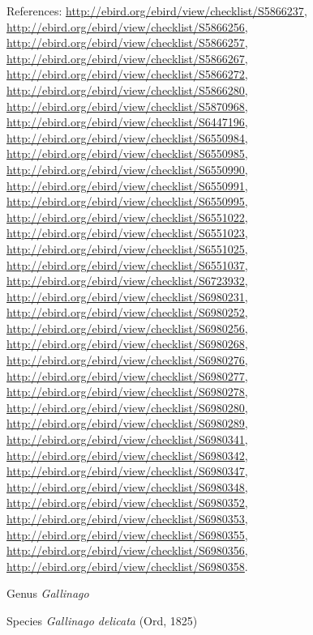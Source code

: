 \documentclass[9pt, article]{memoir}
\begin{document}
\begin{multicols}{2}
\vspace{6pt}References: 
\url{http://ebird.org/ebird/view/checklist/S5866237}, 
\url{http://ebird.org/ebird/view/checklist/S5866256}, 
\url{http://ebird.org/ebird/view/checklist/S5866257}, 
\url{http://ebird.org/ebird/view/checklist/S5866267}, 
\url{http://ebird.org/ebird/view/checklist/S5866272}, 
\url{http://ebird.org/ebird/view/checklist/S5866280}, 
\url{http://ebird.org/ebird/view/checklist/S5870968}, 
\url{http://ebird.org/ebird/view/checklist/S6447196}, 
\url{http://ebird.org/ebird/view/checklist/S6550984}, 
\url{http://ebird.org/ebird/view/checklist/S6550985}, 
\url{http://ebird.org/ebird/view/checklist/S6550990}, 
\url{http://ebird.org/ebird/view/checklist/S6550991}, 
\url{http://ebird.org/ebird/view/checklist/S6550995}, 
\url{http://ebird.org/ebird/view/checklist/S6551022}, 
\url{http://ebird.org/ebird/view/checklist/S6551023}, 
\url{http://ebird.org/ebird/view/checklist/S6551025}, 
\url{http://ebird.org/ebird/view/checklist/S6551037}, 
\url{http://ebird.org/ebird/view/checklist/S6723932}, 
\url{http://ebird.org/ebird/view/checklist/S6980231}, 
\url{http://ebird.org/ebird/view/checklist/S6980252}, 
\url{http://ebird.org/ebird/view/checklist/S6980256}, 
\url{http://ebird.org/ebird/view/checklist/S6980268}, 
\url{http://ebird.org/ebird/view/checklist/S6980276}, 
\url{http://ebird.org/ebird/view/checklist/S6980277}, 
\url{http://ebird.org/ebird/view/checklist/S6980278}, 
\url{http://ebird.org/ebird/view/checklist/S6980280}, 
\url{http://ebird.org/ebird/view/checklist/S6980289}, 
\url{http://ebird.org/ebird/view/checklist/S6980341}, 
\url{http://ebird.org/ebird/view/checklist/S6980342}, 
\url{http://ebird.org/ebird/view/checklist/S6980347}, 
\url{http://ebird.org/ebird/view/checklist/S6980348}, 
\url{http://ebird.org/ebird/view/checklist/S6980352}, 
\url{http://ebird.org/ebird/view/checklist/S6980353}, 
\url{http://ebird.org/ebird/view/checklist/S6980355}, 
\url{http://ebird.org/ebird/view/checklist/S6980356}, 
\url{http://ebird.org/ebird/view/checklist/S6980358}.

\vspace{6pt}\noindent\hspace{30pt}Genus \textit{Gallinago}


\vspace{6pt}\noindent\hspace{36pt}Species \textit{Gallinago delicata} (Ord, 1825)



\end{multicols}
\end{document}
